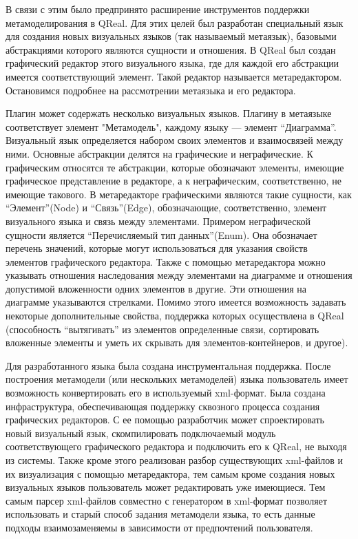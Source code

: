 \documentclass[a4paper]{article}
\begin{document}
В связи с этим было предпринято расширение инструментов поддержки метамоделирования в QReal. Для этих целей был разработан специальный язык для создания новых визуальных языков (так называемый метаязык), базовыми абстракциями которого являются сущности и отношения. В QReal был создан графический редактор этого визуального языка, где для каждой его абстракции имеется соответствующий элемент. Такой редактор называется метаредактором. Остановимся подробнее на рассмотрении метаязыка и его редактора. 

Плагин может содержать несколько визуальных языков. Плагину в метаязыке соответствует элемент "Метамодель", каждому языку --- элемент "`Диаграмма"'. Визуальный язык определяется набором своих элементов и взаимосвязей между ними. Основные абстракции делятся на графические и неграфические. К графическим относятся те абстракции, которые обозначают элементы, имеющие графическое представление в редакторе, а к неграфическим, соответственно, не имеющие такового. В метаредакторе графическими являются такие сущности, как "`Элемент"'(Node) и "`Связь"'(Edge), обозначающие, соответственно, элемент визуального языка и связь между элементами. Примером неграфической сущности является "`Перечисляемый тип данных"'(Enum). Она обозначает перечень значений, которые могут использоваться для указания свойств элементов графического редактора. Также с помощью метаредактора можно указывать отношения наследования между элементами на диаграмме и отношения допустимой вложенности одних элементов в другие. Эти отношения на диаграмме указываются стрелками. Помимо этого имеется возможность задавать некоторые дополнительные свойства, поддержка которых осуществлена в QReal (способность “вытягивать” из элементов определенные связи, сортировать вложенные элементы и уметь их скрывать для элементов-контейнеров, и другое). 

Для разработанного языка была создана инструментальная поддержка. После построения метамодели (или нескольких метамоделей) языка пользователь имеет возможность конвертировать его в используемый xml-формат. Была создана инфраструктура, обеспечивающая поддержку сквозного процесса создания графических редакторов. С ее помощью разработчик может спроектировать новый визуальный язык, скомпилировать подключаемый модуль соответствующего графического редактора и подключить его к QReal, не выходя из системы. Также кроме этого реализован разбор существующих xml-файлов и их визуализация с помощью метаредактора, тем самым кроме создания новых визуальных языков пользователь может редактировать уже имеющиеся. Тем самым парсер xml-файлов совместно с генератором в xml-формат позволяет использовать и старый способ задания метамодели языка, то есть данные подходы взаимозаменяемы в зависимости от предпочтений пользователя.
\end{document}

